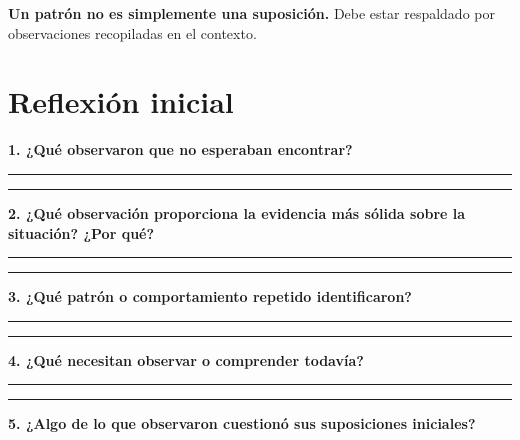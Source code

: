 \documentclass[12pt,a4paper]{article}
\begin{document}
	
	\textbf{Un patrón no es simplemente una suposición.} Debe estar respaldado por observaciones recopiladas en el contexto.
	
	\newpage
	\section*{Reflexión inicial}
	
	\textbf{1. ¿Qué observaron que no esperaban encontrar?}
	
	\vspace{0.1cm}
	
	\rule{\linewidth}{0.4pt}
	
	\vspace{0.35cm}
	
	\rule{\linewidth}{0.4pt}
	
	\vspace{0.4cm}
	
	\textbf{2. ¿Qué observación proporciona la evidencia más sólida sobre la situación? ¿Por qué?}
	
	\vspace{0.1cm}
	
	\rule{\linewidth}{0.4pt}
	
	\vspace{0.35cm}
	
	\rule{\linewidth}{0.4pt}
	
	\vspace{0.4cm}
	
	\textbf{3. ¿Qué patrón o comportamiento repetido identificaron?}
	
	\vspace{0.1cm}
	
	\rule{\linewidth}{0.4pt}
	
	\vspace{0.35cm}
	
	\rule{\linewidth}{0.4pt}
	
	\vspace{0.4cm}
	
	\textbf{4. ¿Qué necesitan observar o comprender todavía?}
	
	\vspace{0.1cm}
	
	\rule{\linewidth}{0.4pt}
	
	\vspace{0.35cm}
	
	\rule{\linewidth}{0.4pt}
	
	\vspace{0.4cm}
	
	\textbf{5. ¿Algo de lo que observaron cuestionó sus suposiciones iniciales?}
	
\end{document}
